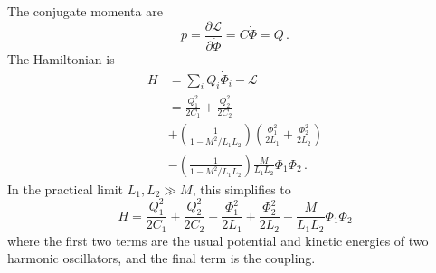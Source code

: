 The conjugate momenta are
\begin{equation}
p = \frac{\partial \mathcal{L}}{\partial \dot{\Phi}} = C \dot{\Phi} = Q \, .
\end{equation}
The Hamiltonian is
\begin{align}
  H
  &= \sum_i Q_i \dot{\Phi}_i - \mathcal{L} \nonumber \\
  &= \frac{Q_1^2}{2 C_1} + \frac{Q_2^2}{2 C_2} \nonumber \\
  &+ \left( \frac{1}{1 - M^2 / L_1L_2} \right)
    \left( \frac{\Phi_1^2}{2L_1} + \frac{\Phi_2^2}{2L_2} \right) \nonumber \\
  &- \left( \frac{1}{1 - M^2 / L_1 L_2} \right) \frac{M}{L_1 L_2} \Phi_1 \Phi_2 \, .
\end{align}
In the practical limit $L_1,L_2 \gg M$, this simplifies to
\begin{equation}
  H =
    \frac{Q_1^2}{2C_1} + \frac{Q_2^2}{2C_2}
  + \frac{\Phi_1^2}{2L_1} + \frac{\Phi_2^2}{2L_2}
  - \frac{M}{L_1 L_2} \Phi_1 \Phi_2
\end{equation}
where the first two terms are the usual potential and kinetic energies of two harmonic oscillators, and the final term is the coupling.
